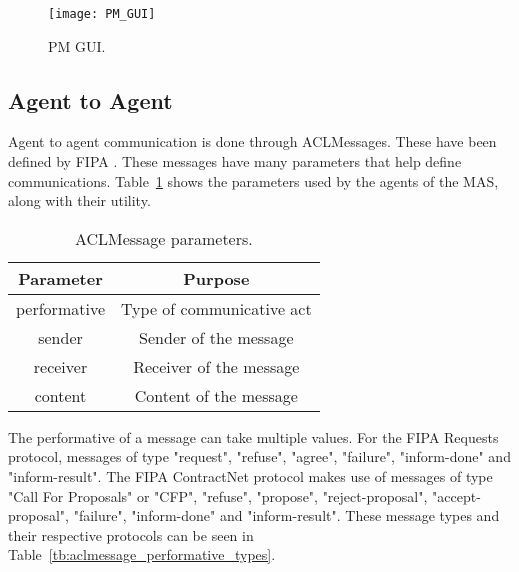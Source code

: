 \begin{figure}[h!]
	\centering
	\texttt{[image: PM\_GUI]}
	\caption{\acrlong{PM} \acrlong{GUI}.}
	\label{fig:pm_gui}
\end{figure}

\subsection{Agent to Agent}
\label{subsec:agent_to_agent_interface}

Agent to agent communication is done through ACLMessages. These have been defined by \acrshort{FIPA} \cite{FIPA_ACLMessage}. These messages have many parameters that help define communications. Table~\ref{tb:aclmessage_parameters} shows the parameters used by the agents of the \acrshort{MAS}, along with their utility.\\

\begin{table}[h!]
	\centering
	\caption{ACLMessage parameters.}
	\begin{tabular}{|c|c|}
		\hline
		Parameter    & Purpose                   \\ \hline
		performative & Type of communicative act \\ \hline
		sender       & Sender of the message     \\ \hline
		receiver     & Receiver of the message   \\ \hline
		content      & Content of the message    \\ \hline
	\end{tabular}
	\label{tb:aclmessage_parameters}
\end{table}

The performative of a message can take multiple values. For the \acrshort{FIPA} Requests protocol, messages of type "request", "refuse", "agree", "failure", "inform-done" and "inform-result". The \acrshort{FIPA} ContractNet protocol makes use of messages of type "Call For Proposals" or "CFP", "refuse", "propose", "reject-proposal", "accept-proposal", "failure", "inform-done" and "inform-result". These message types and their respective protocols can be seen in Table~\ref{tb:aclmessage_performative_types}.\\

